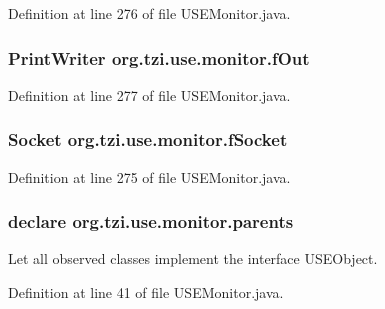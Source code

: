 Definition at line 276 of file U\-S\-E\-Monitor.\-java.

\hypertarget{namespaceorg_1_1tzi_1_1use_1_1monitor_a2029dfe3291bc83da4b8a679cbc8f95e}{
\subsubsection[{f\-Out}]{\setlength{\rightskip}{0pt plus 5cm}Print\-Writer org.\-tzi.\-use.\-monitor.\-f\-Out}}\label{namespaceorg_1_1tzi_1_1use_1_1monitor_a2029dfe3291bc83da4b8a679cbc8f95e}


Definition at line 277 of file U\-S\-E\-Monitor.\-java.

\hypertarget{namespaceorg_1_1tzi_1_1use_1_1monitor_a9774d6a712b4ac480ee3f1a266c9f505}{
\subsubsection[{f\-Socket}]{\setlength{\rightskip}{0pt plus 5cm}Socket org.\-tzi.\-use.\-monitor.\-f\-Socket}}\label{namespaceorg_1_1tzi_1_1use_1_1monitor_a9774d6a712b4ac480ee3f1a266c9f505}


Definition at line 275 of file U\-S\-E\-Monitor.\-java.

\hypertarget{namespaceorg_1_1tzi_1_1use_1_1monitor_a55af043cfffcc5cf67a540f40211e988}{
\subsubsection[{parents}]{\setlength{\rightskip}{0pt plus 5cm}declare org.\-tzi.\-use.\-monitor.\-parents}}\label{namespaceorg_1_1tzi_1_1use_1_1monitor_a55af043cfffcc5cf67a540f40211e988}
Let all observed classes implement the interface U\-S\-E\-Object. 

Definition at line 41 of file U\-S\-E\-Monitor.\-java.

